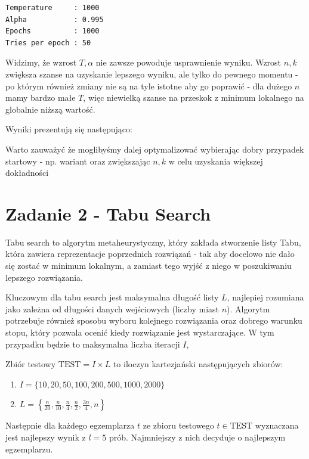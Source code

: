 \documentclass{article}
\begin{document}
\begin{verbatim}
Temperature     : 1000
Alpha           : 0.995
Epochs          : 1000
Tries per epoch : 50
\end{verbatim}

Widzimy, że wzrost $T,\alpha$ nie zawsze powoduje usprawnienie wyniku. Wzrost $n,k$ zwiększa szanse
na uzyskanie lepszego wyniku, ale tylko do pewnego momentu - po którym również zmiany nie są na tyle istotne
aby go poprawić - dla dużego $n$ mamy bardzo małe $T$, więc niewielką szanse na przeskok z minimum lokalnego na globalnie
niższą wartość.

\noindent
Wyniki prezentują się następująco:



\noindent
Warto zauważyć że moglibyśmy dalej optymalizować wybierając dobry przypadek startowy - np. wariant 
oraz zwiększając $n, k$ w celu uzyskania większej dokładności

\section{Zadanie 2 - Tabu Search}

Tabu search to algorytm metaheurystyczny, który zakłada stworzenie listy Tabu,
która zawiera reprezentacje poprzednich rozwiązań - tak aby docelowo nie dało się 
zostać w minimum lokalnym, a zamiast tego wyjść z niego w poszukiwaniu lepszego rozwiązania.

\noindent
Kluczowym dla tabu search jest maksymalna długość listy $L$, najlepiej rozumiana jako
zależna od długości danych wejściowych (liczby miast $n$). Algorytm
potrzebuje również sposobu wyboru kolejnego rozwiązania oraz dobrego warunku stopu,
który pozwala ocenić kiedy rozwiązanie jest wystarczające.
W tym przypadku będzie to maksymalna liczba iteracji $I$,

\noindent
\noindent
Zbiór testowy $\text{TEST}=I\times L$ to iloczyn kartezjański następujących zbiorów:

\begin{enumerate}
    \item $I=\{10, 20, 50, 100, 200, 500, 1000, 2000\}$
    \item $L=\left\{\frac{n}{20}, \frac{n}{10},\frac{n}{4},\frac{n}{2},\frac{3n}{4},n\right\}$
\end{enumerate}
Następnie dla każdego egzemplarza $t$ ze zbioru testowego $t\in\text{TEST}$ wyznaczana jest najlepszy wynik
z $l=5$ prób. Najmniejszy z nich decyduje o najlepszym egzemplarzu.
\end{document}
